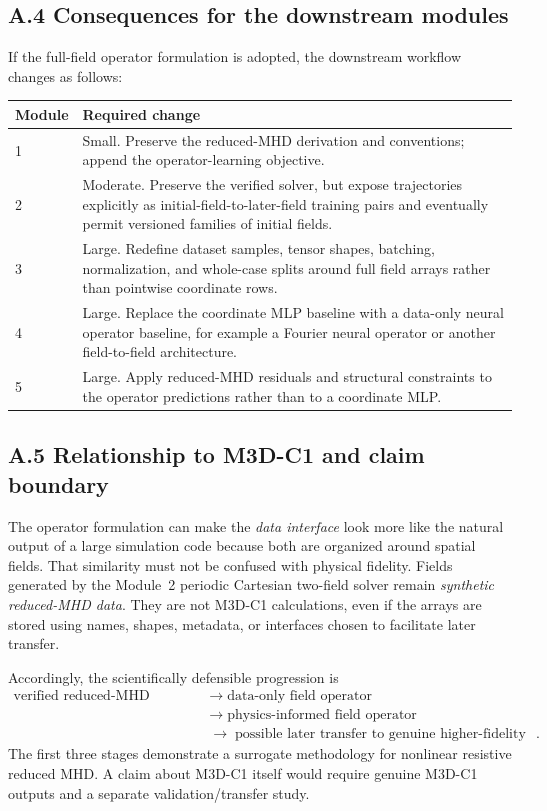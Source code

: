 \documentclass[11pt]{article}
\begin{document}
\subsection*{A.4 Consequences for the downstream modules}

If the full-field operator formulation is adopted, the downstream workflow
changes as follows:
\begin{center}
\begin{tabular}{p{}p{}}
\toprule
\textbf{Module} & \textbf{Required change}\\
\midrule
1 & Small.  Preserve the reduced-MHD derivation and conventions; append the operator-learning objective.\\
2 & Moderate.  Preserve the verified solver, but expose trajectories explicitly as initial-field-to-later-field training pairs and eventually permit versioned families of initial fields.\\
3 & Large.  Redefine dataset samples, tensor shapes, batching, normalization, and whole-case splits around full field arrays rather than pointwise coordinate rows.\\
4 & Large.  Replace the coordinate MLP baseline with a data-only neural operator baseline, for example a Fourier neural operator or another field-to-field architecture.\\
5 & Large.  Apply reduced-MHD residuals and structural constraints to the operator predictions rather than to a coordinate MLP.\\
\bottomrule
\end{tabular}
\end{center}

\clearpage
\subsection*{A.5 Relationship to M3D-C1 and claim boundary}

The operator formulation can make the \emph{data interface} look more like the
natural output of a large simulation code because both are organized around
spatial fields.  That similarity must not be confused with physical fidelity.
Fields generated by the Module~2 periodic Cartesian two-field solver remain
\emph{synthetic reduced-MHD data}.  They are not M3D-C1 calculations, even if
the arrays are stored using names, shapes, metadata, or interfaces chosen to
facilitate later transfer.

Accordingly, the scientifically defensible progression is
\begin{equation}
\begin{aligned}
\text{verified reduced-MHD trajectories}
&\;\longrightarrow\;\text{data-only field operator}\\
&\;\longrightarrow\;\text{physics-informed field operator}\\
&\;\longrightarrow\;\text{possible later transfer to genuine higher-fidelity data}.
\end{aligned}
\tag{A.9}
\end{equation}
The first three stages demonstrate a surrogate methodology for nonlinear
resistive reduced MHD.  A claim about M3D-C1 itself would require genuine
M3D-C1 outputs and a separate validation/transfer study.
\end{document}
